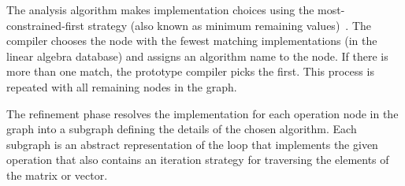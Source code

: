 \documentclass[runningheads]{llncs}
\begin{document}
The analysis algorithm makes implementation choices using the
most-con\-strained-first strategy (also known as minimum remaining
values)~\cite{Russell:2003mz}.  The compiler chooses the node with the fewest
matching implementations (in the linear algebra database) and assigns an
algorithm name to the node.  If there is more than one match, the prototype
compiler picks the first.  This process is repeated with all remaining nodes
in the graph.


The refinement phase resolves the implementation for each operation node in
the graph into a subgraph defining the details of the chosen algorithm.  Each
subgraph is an abstract representation of the loop that implements the given
operation that also contains an iteration strategy for traversing the
elements of the matrix or vector.

%



\end{document}
